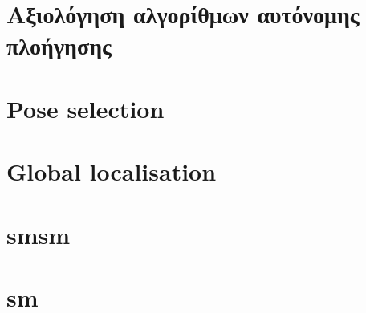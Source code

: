 \chapter{Αξιολόγηση αλγορίθμων αυτόνομης πλοήγησης}
  

\chapter{Pose selection}
\chapter{Global localisation}
\chapter{smsm}
\chapter{sm}

